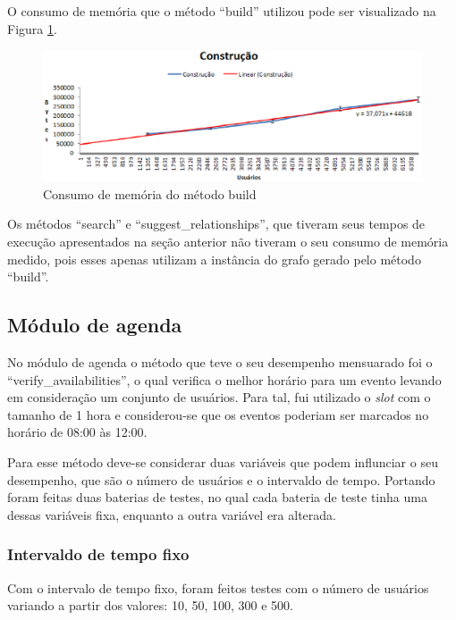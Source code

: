 O consumo de memória que o método ``build'' utilizou pode ser visualizado na Figura \ref{build_memoria}.

\begin{figure}[!h]
	\centering
	\includegraphics[scale=0.8]{figuras/resultados/graficos/construcao_memo.eps}
	\caption[Consumo de memória do método build]{Consumo de memória do método build}
	\label{build_memoria}
\end{figure}

Os métodos ``search'' e ``suggest\_relationships'', que tiveram seus tempos de execução apresentados na seção anterior não tiveram o seu consumo de memória medido, pois esses apenas utilizam a instância do grafo gerado pelo método ``build''.

\subsection{Módulo de agenda}

No módulo de agenda o método que teve o seu desempenho mensuarado foi o ``verify\_availabilities'', o qual verifica o melhor horário para um evento levando em consideração um conjunto de usuários. Para tal, fui utilizado o \textit{slot} com o tamanho de 1 hora e considerou-se que os eventos poderiam ser marcados no horário de 08:00 às 12:00.

Para esse método deve-se considerar duas variáveis que podem influnciar o seu desempenho, que são o número de usuários e o intervaldo de tempo. Portando foram feitas duas baterias de testes, no qual cada bateria de teste tinha uma dessas variáveis fixa, enquanto a outra variável era alterada.

\subsubsection{Intervaldo de tempo fixo}

Com o intervalo de tempo fixo, foram feitos testes com o número de usuários variando a partir dos valores: 10, 50, 100, 300 e 500.

